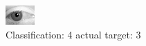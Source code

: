 \begin{figure}[h!]
\begin{center}
\includegraphics[width=0.60\columnwidth]{figures/ID2804_class_4_target_3.png}
\end{center}
\caption{ Classification: 4 actual target: 3}
\label{fig:ID2804_class_4_target_3}
\end{figure}
